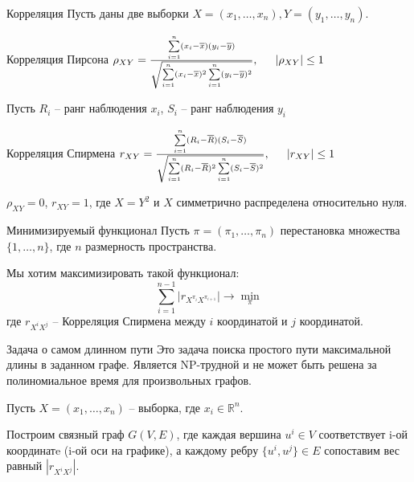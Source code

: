 \documentclass[fleqn, xcolor=x11names]{beamer}
\begin{document}
\begin{frame}{Корреляция}
    Пусть даны две выборки $X=(x_1, \ldots ,x_n), Y=(y_1,\ldots ,y_n)$.

    \begin{block}{Корреляция Пирсона}
            \centering
            $\rho_{XY} = 
            \frac{\sum\limits_{i=1}^{n}(x_i-\overline x)(y_i-\overline y)}
            {\sqrt{\sum\limits_{i=1}^{n}(x_i-\overline x)^2\sum\limits_{i=1}^{n}(y_i-\overline y)^2}}, 
            \hspace{15px} \left\lvert \rho_{XY} \right\rvert \leq 1$
    \end{block}

    Пусть $R_i$ -- ранг наблюдения $x_i$, $S_i$ -- ранг наблюдения $y_i$

    \begin{block}{Корреляция Спирмена}
        \centering
        $r_{XY} = 
        \frac{\sum\limits_{i=1}^{n}(R_i-\overline R)(S_i-\overline S)}
        {\sqrt{\sum\limits_{i=1}^{n}(R_i-\overline R)^2\sum\limits_{i=1}^{n}(S_i-\overline S)^2}},
        \hspace{15px} \left\lvert r_{XY} \right\rvert \leq 1$
    \end{block}
    $\rho_{XY} = 0$, $r_{XY} = 1$, где $X=Y^2$ и $X$ симметрично распределена относительно нуля.

\end{frame}

\begin{frame}{Минимизируемый функционал}
    Пусть $\pi = (\pi_1, \ldots , \pi_n)$ перестановка множества $\{1,\ldots, n\}$, где $n$ размерность пространства.

    Мы хотим максимизировать такой функционал: 
    $$\sum\limits_{i=1}^{n-1}|r_{X^{\pi_i}X^{\pi_{i+1}}}| \rightarrow \min\limits_\pi$$
    где $r_{X^iX^j}$ -- Корреляция Спирмена между  $i$ координатой и $j$ координатой.
    
    \vspace{10pt}

\end{frame}


\begin{frame}{}

    \begin{block}{Задача о самом длинном пути}
    Это задача поиска простого пути максимальной длины в заданном графе.
    Является NP-трудной и не может быть решена за 
    полиномиальное время для произвольных графов.
    \end{block}

    \vspace{10px}

    Пусть $X=(x_1,\ldots,x_n)$ -- выборка, где $x_i\in \mathbb{R}^n$. 

    \vspace{10px}

    Построим связный граф $G(V,E)$, где каждая вершина $u^i \in V$ соответствует
    i-ой координатe (i-ой оси на графике), а каждому ребру $\{u^i,u^j\} \in E$ сопоставим вес равный $|r_{X^iX^j}|$.

\end{frame}
\end{document}
